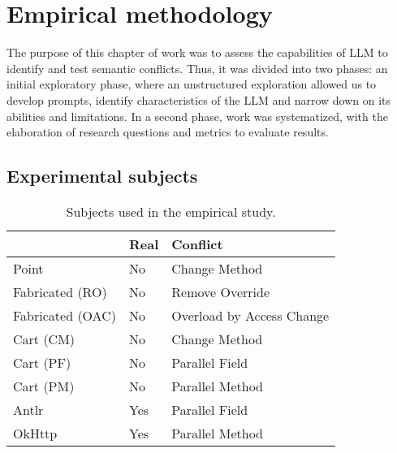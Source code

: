 \chapter{Empirical methodology}\label{chap:study}

The purpose of this chapter of work was to assess the capabilities of LLM to identify and test semantic conflicts.
Thus, it was divided into two phases: an initial exploratory phase, where an unstructured exploration allowed us to develop prompts, identify characteristics of the LLM and narrow down on its abilities and limitations.
In a second phase, work was systematized, with the elaboration of research questions and metrics to evaluate results.

\section{Experimental subjects}\label{chap:study:subjects}

\begin{table}[t]
\centering
\begin{tabular}{@{\extracolsep{\fill}} lll} \toprule
                 & Real & Conflict \\
\midrule
Point            & No  & Change Method \\
Fabricated (RO)  & No  & Remove Override \\
Fabricated (OAC) & No  & Overload by Access Change \\
Cart (CM)        & No  & Change Method \\
Cart (PF)        & No  & Parallel Field \\
Cart (PM)        & No  & Parallel Method \\
Antlr            & Yes & Parallel Field \\
OkHttp           & Yes & Parallel Method \\
\bottomrule
\end{tabular}
\caption{Subjects used in the empirical study.\label{tab:subjects}}
\end{table}

